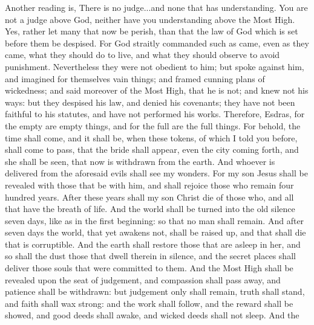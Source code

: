 {{Another reading is,
There is no judge...and none that has understanding.
} You are not a judge above God, neither have you understanding above the Most High.
Yes, rather let many that now be perish, than that the law of God which is set before them be despised.
For God straitly commanded such as came, even as they came, what they should do to live, and what they should observe to avoid punishment.
Nevertheless they were not obedient to him; but spoke against him, and imagined for themselves vain things;
and framed cunning plans of wickedness; and said moreover of the Most High, that he is not; and knew not his ways:
but they despised his law, and denied his covenants; they have not been faithful to his statutes, and have not performed his works.
Therefore, Esdras, for the empty are empty things, and for the full are the full things.
For behold, the time shall come, and it shall be, when these tokens, of which I told you before, shall come to pass, that the bride shall appear, even the city coming forth, and she shall be seen, that now is withdrawn from the earth.
And whoever is delivered from the aforesaid evils shall see my wonders.
For my son Jesus shall be revealed with those that be with him, and shall rejoice those who remain four hundred years.
After these years shall my son Christ die of those who, and all that have the breath of
 life.
And the world shall be turned into the old silence seven days, like as in the first beginning: so that no man shall remain.
And after seven days the world, that yet awakens not, shall be raised up, and that shall die that is corruptible.
And the earth shall restore those that are asleep in her, and so shall the dust those that dwell therein in silence, and the
 secret places shall deliver those souls that were committed to them.
And the Most High shall be revealed upon the seat of judgement,
 and compassion shall pass away, and patience shall be withdrawn:
but judgement only shall remain, truth shall stand, and faith shall wax strong:
and the work shall follow, and the reward shall be showed, and good deeds shall awake, and wicked deeds shall not sleep.
And the
}
